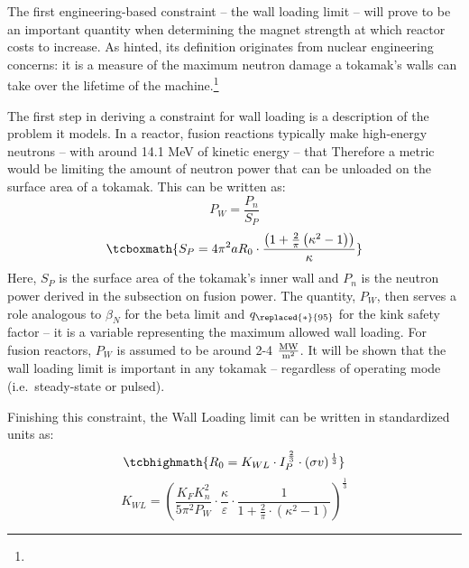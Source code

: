 \label{subsection:wall_loading}

The first engineering-based  constraint -- the wall loading limit -- will prove to be an important quantity when determining the magnet strength at which reactor costs  to increase. As hinted, its definition originates from nuclear engineering concerns: it is a measure of the maximum neutron damage a tokamak's walls can take over the lifetime of the machine.\footnote{}

The first step in deriving a  constraint for wall loading is a description of the problem it models. In a reactor, fusion reactions typically make high-energy neutrons -- with around 14.1 MeV of kinetic energy -- that  Therefore a  metric would be limiting the amount of neutron power that can be unloaded on the surface area of a tokamak. This can be written as:\cite{minervini}
\begin{equation}
	P_W = \frac{ P_n }{ S_P }
\end{equation}
\begin{equation}
	\tcboxmath{
	S_P = 4 \pi^2 a R_0 \cdot \frac{ \left( 1 + \frac{2}{\pi} \left( \kappa^2 -1 \right) \right) }{ \kappa }
	}
\end{equation}
Here, $S_P$ is the surface area of the tokamak's inner wall and $P_n$ is the neutron power derived in the subsection on fusion power. The quantity, $P_W$, then serves a role analogous to $\beta_N$ for the beta limit and $q_{\replaced{*}{95}}$ for the kink safety factor -- it is a  variable representing the maximum allowed wall loading. For fusion reactors, $P_W$ is assumed to be around 2-4 $\frac{\textnormal{MW}}{\textnormal{m}^2}$. It will be shown that the wall loading limit is important in any tokamak -- regardless of operating mode (i.e.\ steady-state or pulsed).

Finishing this  constraint, the Wall Loading limit can be written in standardized units as:
\begin{equation}
	\label{eq:r_wall}
	\tcbhighmath{ R_0 = K_{WL} \cdot I_P^{ \, \frac{2}{3} } \cdot (\sigma v) ^{ \, \frac{1}{3} } }
\end{equation}
\begin{equation}
	K_{WL} = \left( \frac{ K_F K_n^2 }{ 5 \pi^2 P_W } \cdot \frac{\kappa}{\varepsilon} \cdot \frac{1}{1 + \frac{2}{\pi} \cdot ( \kappa^2 - 1 ) } \right) ^ { \frac{1}{3} }
\end{equation}
